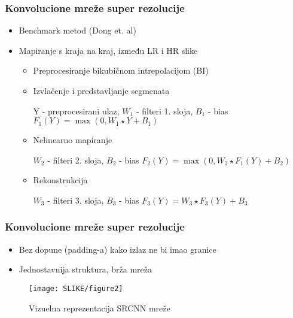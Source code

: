 \documentclass{beamer}
\begin{document}
\begin{frame}
\frametitle{Konvolucione mreže super rezolucije}
\begin{itemize}
\item Benchmark metod (Dong et. al)
\item Mapiranje s kraja na kraj, između LR i HR slike
\begin{itemize}
\item Preprocesiranje bikubičnom intrepolacijom (BI)
\item Izvlačenje i predstavljanje segmenata
\begin{block}{Y - preprocesirani ulaz, $W_1$ - filteri 1. sloja, $B_1$ - bias}
 $ F_1(Y) = \max(0, W_1 \star Y + B_1)$
\end{block}
\item Nelinearno mapiranje
\begin{block}{$W_2$ - filteri 2. sloja, $B_2$ - bias}
 $ F_2(Y) = \max(0, W_2 \star F_1(Y) + B_2)$
\end{block}
\item Rekonstrukcija
\begin{block}{$W_3$ - filteri 3. sloja, $B_3$ - bias}
 $F_3(Y) =  W_3 \star F_3(Y) + B_3$
\end{block}

\end{itemize}
\end{itemize}
\end{frame}


\begin{frame}
\frametitle{Konvolucione mreže super rezolucije}
\begin{itemize}
\begin{block}{Postavke hiperparametara}
 $f_1 = 9, f_2 = 1, f_3 = 5, n_1 = 64 \text{ i } n_2 = 32$
\end{block}
\item Bez dopune (padding-a) kako izlaz ne bi imao granice
\item Jednostavnija struktura, brža mreža
\end{itemize}


\begin{figure}[h]
\texttt{[image: SLIKE/figure2]}
\centering
\caption{Vizuelna reprezentacija SRCNN mreže}
\label{fig:srcnn}
\end{figure}

\end{frame}
\end{document}
